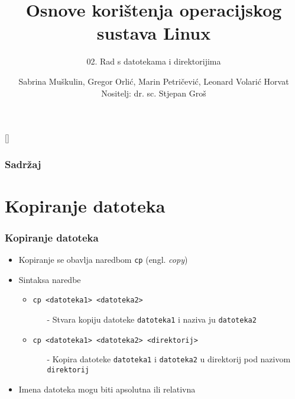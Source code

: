 \documentclass{beamer}
\title{Osnove korištenja operacijskog sustava Linux}
\subtitle{02. Rad s datotekama i direktorijima}
\author[Sabrina Miškulin, Gregor Orlić, Marin Petričević, Leonard Volarić Horvat]{Sabrina Muškulin, Gregor Orlić, Marin Petričević, Leonard Volarić Horvat\\{\small Nositelj: dr. sc. Stjepan Groš}}
\institute[FER]{Sveučilište u Zagrebu \\
				Fakultet elektrotehnike i računarstva}
\date{\todayiso}
\begin{document}
[]

\begin{frame}
\maketitle
\end{frame}

\begin{frame}
\frametitle{Sadržaj}
\tableofcontents
\end{frame}

\section{Kopiranje datoteka}
\begin{frame}[t]
\frametitle{Kopiranje datoteka}
\begin{itemize}
  \item Kopiranje se obavlja naredbom \texttt{cp} (engl. \emph{copy})
  \item Sintaksa naredbe
  \begin{itemize}
    \item \texttt{cp \textless datoteka1\textgreater
                     \textless datoteka2\textgreater}
    \begin{itemize}
      \item[-] Stvara kopiju datoteke \texttt{datoteka1} i naziva ju
               \texttt{datoteka2}
    \end{itemize}
    \item \texttt{cp \textless datoteka1\textgreater
                     \textless datoteka2\textgreater
                     \textless direktorij\textgreater}
    \begin{itemize}
      \item[-] Kopira datoteke \texttt{datoteka1} i \texttt{datoteka2} u
               direktorij pod nazivom \texttt{direktorij}
    \end{itemize}
  \end{itemize}
  \item Imena datoteka mogu biti apsolutna ili relativna
\end{itemize}
\end{frame}
\end{document}
